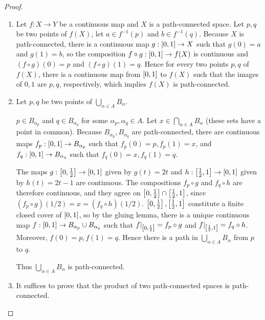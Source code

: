 \begin{proof}
	\begin{enumerate}[label={(\alph*)}]
		\item Let $f: X\to Y$ be a continuous map and $X$ is a path-connected space. Let $p, q$ be two points of $f(X)$, let $a \in f^{-1}(p)$ and $b \in f^{-1}(q)$. Because $X$ is path-connected, there is a continuous map $g: \left[{0, 1}\right] \to X$ such that $g(0) = a$ and $g(1) = b$, so the composition $f\circ g: \left[{0, 1}\right] \to f(X)$ is continuous and $(f\circ g)(0) = p$ and $(f\circ g)(1) = q$. Hence for every two points $p, q$ of $f(X)$, there is a continuous map from $\left[{0, 1}\right]$ to $f(X)$ such that the images of $0, 1$ are $p, q$, respectively, which implies $f(X)$ is path-connected.
		\item Let $p, q$ be two points of $\bigcup_{\alpha\in A}B_{\alpha}$.

		      $p \in B_{\alpha_{p}}$ and $q \in B_{\alpha_{q}}$ for some $\alpha_{p}, \alpha_{q} \in A$. Let $x \in \bigcap_{\alpha\in A}B_{\alpha}$ (these sets have a point in common). Because $B_{\alpha_{p}}, B_{\alpha_{q}}$ are path-connected, there are continuous maps $f_{p}: \left[{0, 1}\right] \to B_{\alpha_{p}}$ such that $f_{p}(0) = p, f_{p}(1) = x$, and $f_{q}: \left[{0, 1}\right] \to B_{\alpha_{q}}$ such that $f_{q}(0) = x, f_{q}(1) = q$.

		      The maps $g: \left[{0, \frac{1}{2}}\right] \to \left[{0, 1}\right]$ given by $g(t) = 2t$ and $h: \left[{\frac{1}{2}, 1}\right] \to \left[{0, 1}\right]$ given by $h(t) = 2t - 1$ are continuous. The compositions $f_{p}\circ g$ and $f_{q}\circ h$ are therefore continuous, and they agree on $\left[{0, \frac{1}{2}}\right] \cap \left[{\frac{1}{2}, 1}\right]$, since $(f_{p}\circ g)(1/2) = x = (f_{q}\circ h)(1/2)$. $\left[{0, \frac{1}{2}}\right], \left[{\frac{1}{2}, 1}\right]$ constitute a finite closed cover of $\left[{0, 1}\right]$, so by the gluing lemma, there is a unique continuous map $f: \left[{0, 1}\right] \to B_{\alpha_{p}} \cup B_{\alpha_{q}}$ such that $f\vert_{\left[{0, \frac{1}{2}}\right]} = f_{p}\circ g$ and $f\vert_{\left[{\frac{1}{2}, 1}\right]} = f_{q}\circ h$. Moreover, $f(0) = p, f(1) = q$. Hence there is a path in $\bigcup_{\alpha\in A}B_{\alpha}$ from $p$ to $q$.

		      Thus $\bigcup_{\alpha\in A}B_{\alpha}$ is path-connected.
		\item It suffices to prove that the product of two path-connected spaces is path-connected.


\end{enumerate}
\end{proof}
